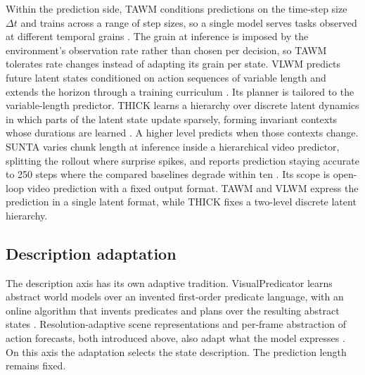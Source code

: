 Within the prediction side, TAWM conditions predictions on the time-step size $\Delta t$ and trains across a range of step sizes, so a single model serves tasks observed at different temporal grains \citep{nhu2025tawm}. The grain at inference is imposed by the environment's observation rate rather than chosen per decision, so TAWM tolerates rate changes instead of adapting its grain per state. VLWM predicts future latent states conditioned on action sequences of variable length and extends the horizon through a training curriculum \citep{du2026vlwm}. Its planner is tailored to the variable-length predictor. THICK learns a hierarchy over discrete latent dynamics in which parts of the latent state update sparsely, forming invariant contexts whose durations are learned \citep{gumbsch2024thick}. A higher level predicts when those contexts change. SUNTA varies chunk length at inference inside a hierarchical video predictor, splitting the rollout where surprise spikes, and reports prediction staying accurate to 250 steps where the compared baselines degrade within ten \citep{iiyama2026sunta}. Its scope is open-loop video prediction with a fixed output format. TAWM and VLWM express the prediction in a single latent format, while THICK fixes a two-level discrete latent hierarchy.

\subsection{Description adaptation}
\label{sec:app:rel:description}

The description axis has its own adaptive tradition. VisualPredicator learns abstract world models over an invented first-order predicate language, with an online algorithm that invents predicates and plans over the resulting abstract states \citep{liang2025visualpredicator}. Resolution-adaptive scene representations and per-frame abstraction of action forecasts, both introduced above, also adapt what the model expresses \citep{wang2023dynamic,scarafoni2022islands}. On this axis the adaptation selects the state description. The prediction length remains fixed.

\subsection{\texorpdfstring{}{Hierarchical world models}}
\label{sec:app:rel:hier}

